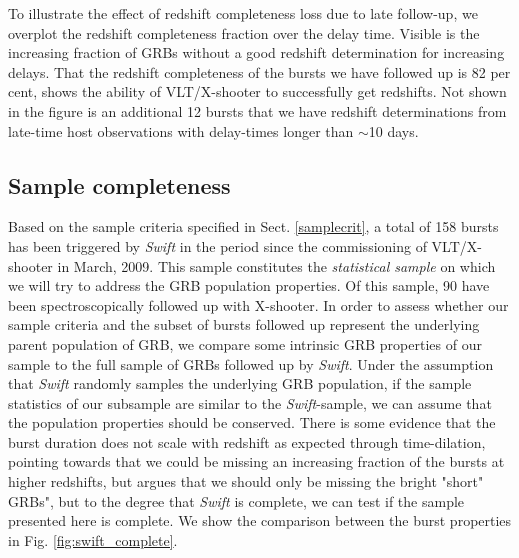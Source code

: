 \documentclass{aa}    %
\begin{document}
To illustrate the effect of redshift completeness loss due to late follow-up, we
overplot the redshift completeness fraction over the delay time. Visible is the
increasing fraction of GRBs without a good redshift determination for increasing
delays. That the redshift completeness of the bursts we have followed up is 82
per cent, shows the ability of VLT/X-shooter to successfully get redshifts. Not
shown in the figure is an additional 12 bursts that we have redshift
determinations from late-time host observations with delay-times longer than
$\sim$10 days.


\subsection{Sample completeness} \label{completeness}

Based on the sample criteria specified in Sect. \ref{samplecrit}, a total of 158
bursts has been triggered by \textit{Swift} in the period since the
commissioning of VLT/X-shooter in March, 2009. This sample constitutes the
\textit{statistical sample} on which we will try to address the GRB population
properties. Of this sample, 90 have been spectroscopically
followed up with X-shooter. In order to assess whether our sample criteria and
the subset of bursts followed up represent the underlying parent population of
GRB, we compare some intrinsic GRB properties of our sample to the full sample
of GRBs followed up by \textit{Swift}. Under the assumption that \textit{Swift}
randomly samples the underlying GRB population, if the sample statistics of our
subsample are similar to the \textit{Swift}-sample, we can assume that the
population properties should be conserved. There is some evidence that the burst
duration does not scale with redshift as expected through
time-dilation\citep{Kocevski2013, Littlejohns2013a}, pointing towards that we
could be missing an increasing fraction of the bursts at higher redshifts, but
\citet{Lien2016} argues that we should only be missing the bright "short" GRBs",
but to the degree that \textit{Swift} is complete, we can test if the sample
presented here is complete. We show the comparison between the burst properties
in Fig. \ref{fig:swift_complete}.
\end{document}
